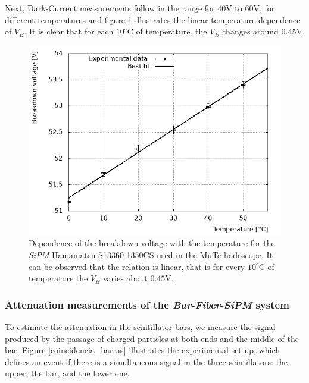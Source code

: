 \documentclass[submitting]{nst}
\begin{document}
Next, Dark-Current \cite{Renker2006} measurements follow in the range for $40$V to $60$V, for different temperatures and figure \ref{temperature} illustrates the linear temperature dependence of  $V_B$. It is clear that  for each $10^{\circ}$C of temperature, the $V_B$ changes around $0.45$V.
\begin{figure}[h!] %
    \centering
        \includegraphics[scale=0.49]{Figures/voltajeRuptura.png}
   \caption{Dependence of the breakdown voltage with the temperature for the \textsl{SiPM} Hamamatsu S13360-1350CS used in the MuTe hodoscope. It can be observed that the relation is linear, that is for every $10^{\circ}$C of temperature the $V_B$ varies about $0.45$V.}\label{temperature}
\end{figure}

\subsubsection{Attenuation measurements of the \textsl{Bar}-\textsl{Fiber}-\textsl{SiPM} system}\label{attenuation-experimental}%
To estimate the attenuation in the scintillator bars, we measure the signal produced by the passage of charged particles at both ends and the middle of the bar. Figure \ref{coincidencia_barras} illustrates the experimental set-up, which defines an event if there is a simultaneous signal in the three scintillators: the upper, the bar, and the lower one. 
\end{document}
